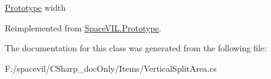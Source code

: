 \mbox{\hyperlink{class_space_v_i_l_1_1_prototype}{Prototype}} width 



Reimplemented from \mbox{\hyperlink{class_space_v_i_l_1_1_prototype_a6a4f1b9581f4d18f1c3a3e287d4b2a2b}{Space\+V\+I\+L.\+Prototype}}.



The documentation for this class was generated from the following file\+:\begin{DoxyCompactItemize}
\item 
F\+:/spacevil/\+C\+Sharp\+\_\+doc\+Only/\+Items/Vertical\+Split\+Area.\+cs\end{DoxyCompactItemize}
